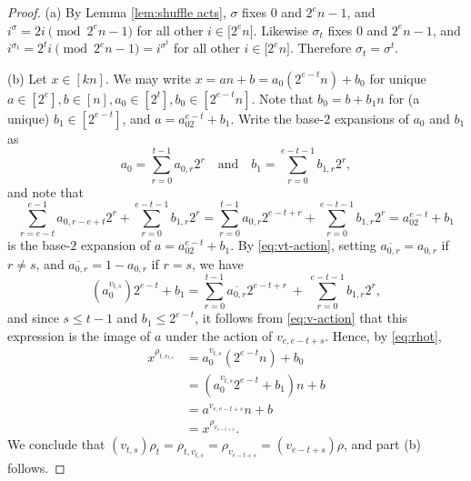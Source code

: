 \documentclass[12pt]{amsart}
\theoremstyle{remark}
\theoremstyle{definition}
\begin{document}
\begin{proof}
(a) By Lemma \ref{lem:shuffle acts}, $\sigma$ fixes $0$ and $2^e n - 1$, and $i^\sigma = 2i \pmod{2^e n - 1}$ for all other $i \in \big[2^e n\big]$. Likewise $\sigma_t$ fixes $0$ and $2^e n - 1$, and  $i^{\sigma_t} = 2^t i \pmod{2^e n - 1} = i^{\sigma^t}$ for all other $i \in \big[2^e n\big]$. Therefore $\sigma_t = \sigma^t$.

(b) Let $x\in [kn]$.  We may write $x=an+b = a_0(2^{e-t}n)+b_0$ for unique $a\in [2^e], b\in [n], a_0\in[2^t], b_0\in[2^{e-t}n]$. Note that 
$b_0=b+b_1n$ for (a unique) $b_1\in[2^{e-t}]$, and $a=a_02^{e-t}+b_1$.  Write the base-$2$ expansions of $a_0$ and $b_1$ as 
\[
a_0=\sum_{r=0}^{t-1}a_{0,r}2^{r}\quad \mbox{and}\quad b_1=\sum_{r=0}^{e-t-1}b_{1,r}2^{r},
\] 
and note that
\[
\sum_{r=e-t}^{e-1}a_{0,r-e+t}2^{r} + \sum_{r=0}^{e-t-1}b_{1,r}2^{r} = \sum_{r=0}^{t-1}a_{0,r}2^{e-t+r} + \sum_{r=0}^{e-t-1}b_{1,r}2^{r}=a_02^{e-t}+b_1
\]
is the base-$2$ expansion of $a=a_02^{e-t}+b_1$. 
By \eqref{eq:vt-action}, setting $\overline{a_{0,r}} = a_{0,r}$ if $r \neq s$, and  $\overline{a_{0,r}} = 1-a_{0,r}$ if $r=s$, we have
\[
(a_0^{v_{t,s}})2^{e-t}+b_1 = \sum_{r=0}^{t-1}\overline{a_{0,r}}2^{e-t+r}\ +\ \sum_{r=0}^{e-t-1}b_{1,r}2^{r},
\]
and since $s\leqslant t-1$ and $b_1\leqslant 2^{e-t}$, it follows from \eqref{eq:v-action} that this expression is the image of $a$ under the action of $v_{e,e-t+s}$. Hence, by \eqref{eq:rhot}, 
\begin{align*}
x^{\rho_{t,v_{t,s}}} &= a_0^{v_{t,s}}(2^{e-t}n)+b_0\\
&= (a_0^{v_{t,s}}2^{e-t}+b_1)n+b\\
&= a^{v_{e,e-t+s}}n+b\\
&= x^{\rho_{v_{e-t+s}}}.
\end{align*}
We conclude that $(v_{t,s})\rho_t=\rho_{t,v_{t,s}}= \rho_{v_{e-t+s}}=(v_{e-t+s})\rho$, and part (b) follows.


\end{proof}
\end{document}
